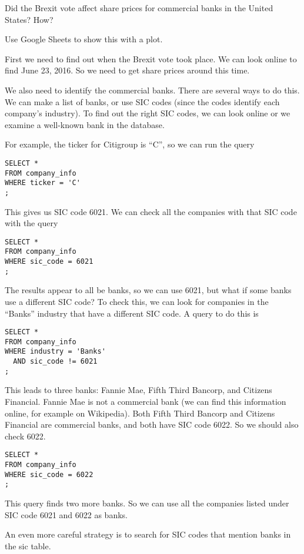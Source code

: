 \documentclass[10pt]{exam}
\begin{document}
\begin{questions}

\question Did the Brexit vote affect share prices for commercial banks in the
United States? How?

Use Google Sheets to show this with a plot.

\begin{solution}
First we need to find out when the Brexit vote took place. We can look online
to find June 23, 2016. So we need to get share prices around this time.

We also need to identify the commercial banks. There are several ways to do
this. We can make a list of banks, or use SIC codes (since the codes identify
each company's industry). To find out the right SIC codes, we can look online
or we examine a well-known bank in the database.

For example, the ticker for Citigroup is ``C'', so we can run the query
\begin{lstlisting}
SELECT *
FROM company_info
WHERE ticker = 'C'
;
\end{lstlisting}
This gives us SIC code 6021. We can check all the companies with that SIC code
with the query
\begin{lstlisting}
SELECT *
FROM company_info
WHERE sic_code = 6021
;
\end{lstlisting}
The results appear to all be banks, so we can use 6021, but what if some banks
use a different SIC code? To check this, we can look for companies in the
``Banks'' industry that have a different SIC code. A query to do this is
\begin{lstlisting}
SELECT *
FROM company_info
WHERE industry = 'Banks'
  AND sic_code != 6021
;
\end{lstlisting}
This leads to three banks: Fannie Mae, Fifth Third Bancorp, and Citizens
Financial. Fannie Mae is not a commercial bank (we can find this information
online, for example on Wikipedia). Both Fifth Third Bancorp and Citizens
Financial are commercial banks, and both have SIC code 6022. So we should also
check 6022.
\begin{lstlisting}
SELECT *
FROM company_info
WHERE sic_code = 6022
;
\end{lstlisting}
This query finds two more banks. So we can use all the companies listed under
SIC code 6021 and 6022 as banks.

An even more careful strategy is to search for SIC codes that mention banks in
the sic table.


\end{solution}
\end{questions}
\end{document}
